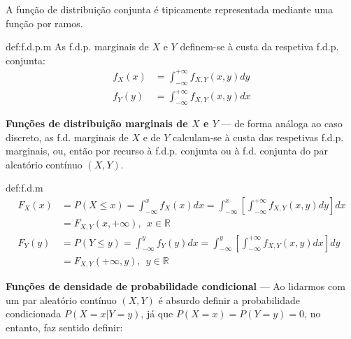 \noindent A função de distribuição conjunta é tipicamente representada mediante uma função por ramos.

\begin{theo}{def:f.d.p.m}\label{def:f.d.p.m}
    \noindent As f.d.p. marginais  de $X$ e $Y$ definem-se à custa da respetiva f.d.p. conjunta:
    \begin{align*}
        f_X(x) &= \int_{-\infty}^{+\infty} f_{X,Y} (x,y)dy\\
        f_Y(y) &= \int_{-\infty}^{+\infty} f_{X,Y} (x,y)dx
    \end{align*}
\end{theo}

\noindent\textbf{Funções de distribuição marginais de $X$ e $Y$} --- de forma análoga ao caso discreto, as f.d. marginais de $X$ e de $Y$ calculam-se à custa das respetivas f.d.p. marginais, ou, então por recurso à f.d.p. conjunta ou à f.d. conjunta do par aleatório contínuo $(X,Y)$.

\begin{theo}{def:f.d.m}\label{def:f.d.m}
    \begin{align*}
        F_X(x) &= P(X \leq x) = \int_{-\infty}^{x} f_X(x)dx = \int_{-\infty}^{x} \left[\int_{-\infty}^{+\infty} f_{X,Y}(x,y)dy\right]dx\\
        &= F_{X,Y}(x, +\infty),\;\, x \in \mathbb{R}\\
        F_Y(y) &= P(Y \leq y) = \int_{-\infty}^{y} f_Y(y)dx = \int_{-\infty}^{y} \left[\int_{-\infty}^{+\infty} f_{X,Y}(x,y)dx\right]dy\\
        &= F_{X,Y}(+\infty,y),\;\, y \in \mathbb{R}
    \end{align*}
\end{theo}

\noindent\textbf{Funções de densidade de probabilidade condicional} ---  Ao lidarmos com um par aleatório contínuo $(X,Y)$ é absurdo definir a probabilidade condicionada $P(X = x | Y = y)$, já que $P(X = x) = P(Y = y) = 0$, no entanto, faz sentido definir:

